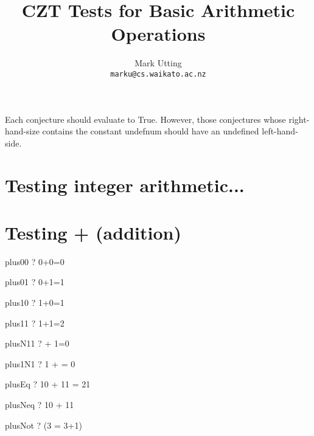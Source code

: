 \documentclass{article}
\title{CZT Tests for Basic Arithmetic Operations}
\author{Mark Utting \\ \texttt{marku@cs.waikato.ac.nz}}
\begin{document}
\maketitle

Each conjecture should evaluate to True.
However, those conjectures whose right-hand-size contains
the constant undefnum should have an undefined left-hand-side.


\section{Testing integer arithmetic...}

\section{Testing + (addition)}
\begin{theorem}{plus00}  \vdash?   0+0=0 \end{theorem}
\begin{theorem}{plus01}  \vdash?   0+1=1 \end{theorem}
\begin{theorem}{plus10}  \vdash?   1+0=1 \end{theorem}
\begin{theorem}{plus11}  \vdash?   1+1=2 \end{theorem}
\begin{theorem}{plusN11} \vdash?    + 1=0 \end{theorem}
\begin{theorem}{plus1N1} \vdash?   1 +  = 0 \end{theorem}
\begin{theorem}{plusEq}  \vdash?   10 + 11 = 21 \end{theorem}
\begin{theorem}{plusNeq} \vdash?   10 + 11  \end{theorem}
\begin{theorem}{plusNot} \vdash?   \lnot (3 = 3+1) \end{theorem}
\end{document}
